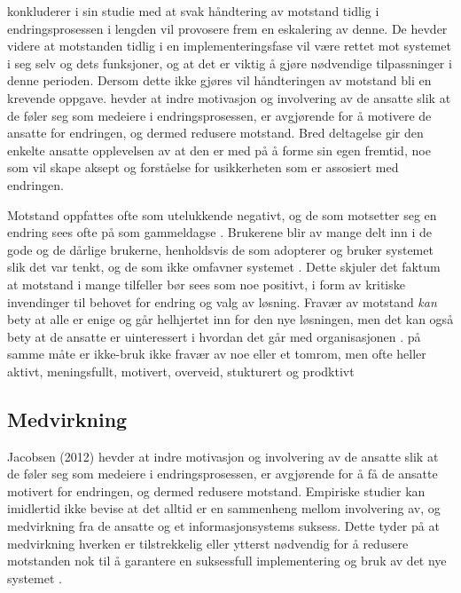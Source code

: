 \noindent
\citet{Lapointe05} konkluderer i sin studie med at svak håndtering av motstand tidlig i endringsprosessen i lengden vil provosere frem en eskalering av denne. De hevder videre at motstanden tidlig i en implementeringsfase vil være rettet mot systemet i seg selv og dets funksjoner, og at det er viktig å gjøre nødvendige tilpassninger i denne perioden. Dersom dette ikke gjøres vil håndteringen av motstand bli en krevende oppgave. \citet{Jacobsen12} hevder at indre motivasjon og involvering av de ansatte slik at de føler seg som medeiere i endringsprosessen, er avgjørende for å motivere de ansatte for endringen, og dermed redusere motstand. Bred deltagelse gir den enkelte ansatte opplevelsen av at den er med på å forme sin egen fremtid, noe som vil skape aksept og forståelse for usikkerheten som er assosiert med endringen.

\noindent
Motstand oppfattes ofte som utelukkende negativt, og de som motsetter seg en endring sees ofte på som gammeldagse \citep{Jacobsen12}. Brukerene blir av mange delt inn i de gode og de dårlige brukerne, henholdsvis de som adopterer og bruker systemet slik det var tenkt, og de som ikke omfavner systemet \citep{Satchell09}. Dette skjuler det faktum at motstand i mange tilfeller bør sees som noe positivt, i form av kritiske invendinger til behovet for endring og valg av løsning. Fravær av motstand \emph{kan} bety at alle er enige og går helhjertet inn for den nye løsningen, men det kan også bety at de ansatte er uinteressert i hvordan det går med organisasjonen \citep{Jacobsen12}. på samme måte er ikke-bruk ikke fravær av noe eller et tomrom, men ofte heller aktivt, meningsfullt, motivert, overveid, stukturert og prodktivt \citep{Satchell09}

\subsection{Medvirkning}
\label{sec:medvirkning}
Jacobsen (2012) hevder at indre motivasjon og involvering av de ansatte slik at de føler seg som medeiere i endringsprosessen, er avgjørende for å få de ansatte motivert for endringen, og dermed redusere motstand.
Empiriske studier kan imidlertid ikke bevise at det alltid er en sammenheng mellom involvering av, og medvirkning fra de ansatte og et informasjonsystems suksess. Dette tyder på at medvirkning hverken er tilstrekkelig eller ytterst nødvendig for å redusere motstanden nok til å garantere en suksessfull implementering og bruk av det nye systemet \citep{Cavaye95}. 

